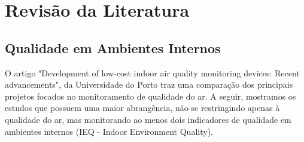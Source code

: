 \documentclass[../monografia.tex]{subfiles}
\begin{document}
\section{Revisão da Literatura} 

\subsection{Qualidade em Ambientes Internos}

O artigo "Development of low-cost indoor air quality monitoring devices:
Recent advancements", da Universidade do Porto\cite{IAQ_Compare} traz uma comparação dos principais projetos focados no monitoramento de qualidade do ar. A seguir, mostramos os estudos que possuem uma maior abrangência, não se restringindo apenas à qualidade do ar, mas monitorando ao menos dois indicadores de qualidade em ambientes internos (IEQ - Indoor Environment Quality). 

\end{document}
